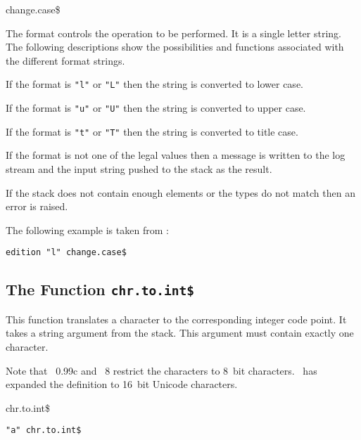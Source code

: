 \begin{BstFunction}{change.case\$}
\end{BstFunction}

The format controls the operation to be performed. It is a single
letter string. The following descriptions show the possibilities and
functions associated with the different format strings.

If the format is \verb|"l"| or \verb|"L"| then the string is converted
to lower case.

If the format is \verb|"u"| or \verb|"U"| then the string is converted
to upper case.

If the format is \verb|"t"| or \verb|"T"| then the string is converted
to title case.

\INCOMPLETE

If the format is not one of the legal values then a message is written
to the log stream and the input string pushed to the stack as the
result.

If the stack does not contain enough elements or the types do not
match then an error is raised.

The following example is taken from :

\begin{lstlisting}[language=bst]
  edition "l" change.case$
\end{lstlisting}


\subsection{The Function \texttt{chr.to.int\$}}%

This function translates a character to the corresponding integer code
point. It takes a string argument from the stack. This argument must
contain exactly one character.

Note that \BibTeX~0.99c and
\BibTeX~8 restrict the characters to 8~bit
characters. \ExBib\ has expanded the definition to 16~bit
Unicode characters.

\begin{BstFunction}{chr.to.int\$}
\end{BstFunction}

\begin{lstlisting}[language=bst]
  "a" chr.to.int$
\end{lstlisting}


